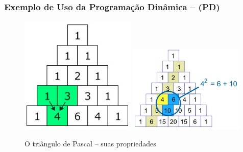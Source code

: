 \begin{frame}[fragile]

\frametitle{Exemplo de Uso da Programação Dinâmica -- (PD)}

\begin{figure}[!htb]
\centering
\includegraphics[width=0.49\textwidth, height=0.50\textheight]{figures/pascals_triangle_01.jpg}
\includegraphics[width=0.49\textwidth, height=0.50\textheight]{figures/pascals_triangle_02.jpg}
\caption{O triângulo de Pascal -- suas propriedades}
\end{figure}


\end{frame}


